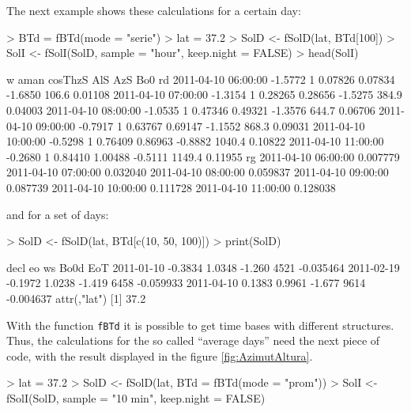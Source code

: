 \documentclass[oldfontcommands,a4paper]{memoir}
\renewenvironment{Schunk}{\vspace{\topsep}}{\vspace{\topsep}}
\begin{document}
The next example shows these calculations for a certain day:
\begin{Schunk}
\begin{Sinput}
> BTd = fBTd(mode = "serie")
> lat = 37.2
> SolD <- fSolD(lat, BTd[100])
> SolI <- fSolI(SolD, sample = "hour", keep.night = FALSE)
> head(SolI)
\end{Sinput}
\begin{Soutput}
                          w aman cosThzS     AlS     AzS    Bo0      rd
2011-04-10 06:00:00 -1.5772    1 0.07826 0.07834 -1.6850  106.6 0.01108
2011-04-10 07:00:00 -1.3154    1 0.28265 0.28656 -1.5275  384.9 0.04003
2011-04-10 08:00:00 -1.0535    1 0.47346 0.49321 -1.3576  644.7 0.06706
2011-04-10 09:00:00 -0.7917    1 0.63767 0.69147 -1.1552  868.3 0.09031
2011-04-10 10:00:00 -0.5298    1 0.76409 0.86963 -0.8882 1040.4 0.10822
2011-04-10 11:00:00 -0.2680    1 0.84410 1.00488 -0.5111 1149.4 0.11955
                          rg
2011-04-10 06:00:00 0.007779
2011-04-10 07:00:00 0.032040
2011-04-10 08:00:00 0.059837
2011-04-10 09:00:00 0.087739
2011-04-10 10:00:00 0.111728
2011-04-10 11:00:00 0.128038
\end{Soutput}
\end{Schunk}

and for a set of days:

\begin{Schunk}
\begin{Sinput}
> SolD <- fSolD(lat, BTd[c(10, 50, 100)])
> print(SolD)
\end{Sinput}
\begin{Soutput}
              decl     eo     ws Bo0d       EoT
2011-01-10 -0.3834 1.0348 -1.260 4521 -0.035464
2011-02-19 -0.1972 1.0238 -1.419 6458 -0.059933
2011-04-10  0.1383 0.9961 -1.677 9614 -0.004637
attr(,"lat")
[1] 37.2
\end{Soutput}
\end{Schunk}

With the function \texttt{fBTd} it is possible to get time bases with 
different structures. Thus, the calculations for the so called ``average days'' 
need the next piece of code, with the result displayed in the figure \ref{fig:AzimutAltura}. 

\begin{Schunk}
\begin{Sinput}
> lat = 37.2
> SolD <- fSolD(lat, BTd = fBTd(mode = "prom"))
> SolI <- fSolI(SolD, sample = "10 min", keep.night = FALSE)
\end{Sinput}
\end{Schunk}
\end{document}
